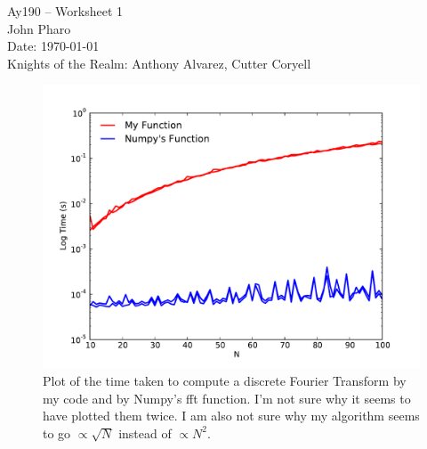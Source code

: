 \documentclass[11pt,letterpaper]{article}
\begin{document}
\begin{center}
\Large
Ay190 -- Worksheet 1\\
John Pharo\\
Date: \today \\
Knights of the Realm: Anthony Alvarez, Cutter Coryell
\end{center}

\begin{figure}[!htb]\centering
  \includegraphics[width=1\textwidth]{Times}
  \caption{Plot of the time taken to compute a discrete Fourier Transform by my code and by Numpy's fft function. I'm not sure why it seems to have plotted them twice. I am also not sure why my algorithm seems to go $\propto \sqrt{N}$ instead of $\propto N^2$.}
  \end{figure}
\end{document}
